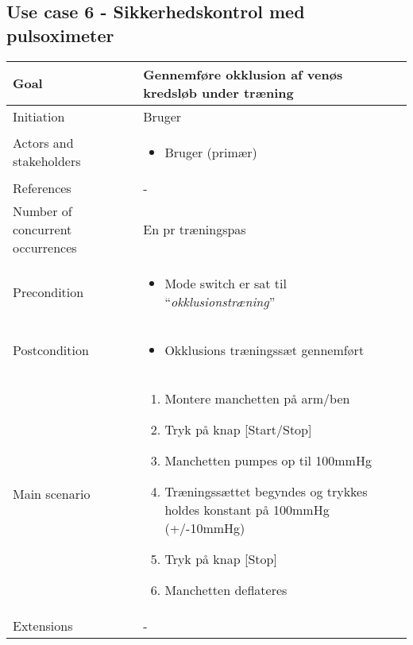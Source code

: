 	\subsection{Use case 6 - Sikkerhedskontrol med pulsoximeter}
		\begin{center}
			\begin{tabular}{ | m{4cm} | m{8cm}| } 
				\hline
				Goal& Gennemføre okklusion af venøs kredsløb under træning  \\ 
				\hline
				Initiation &  Bruger\\
				\hline
				Actors and stakeholders & 
				\begin{itemize}
					\item Bruger (primær)
				\end{itemize} \\ 
				\hline
				References & - \\ 
				\hline
				Number of concurrent occurrences & En pr træningspas \\ 
				\hline	
				Precondition & 
				\begin{itemize}
					\item Mode switch er sat til  “\textit{okklusionstræning}”
 				\end{itemize} \\ 
				\hline
				Postcondition & 
				\begin{itemize}
					\item Okklusions træningssæt gennemført
				\end{itemize} \\ 
				\hline
				Main scenario & \begin{enumerate}
					\setlength\itemsep{0cm} %
					\item Montere manchetten på arm/ben
					\item Tryk på knap [Start/Stop]
					\item Manchetten pumpes op til 100mmHg
					\item Træningssættet begyndes og trykkes holdes konstant på 100mmHg (+/-10mmHg)
					\item Tryk på knap [Stop]
					\item Manchetten deflateres
				\end{enumerate} \\ 
				\hline
				Extensions & - \\ 
				\hline
			\end{tabular}
		\end{center}

		